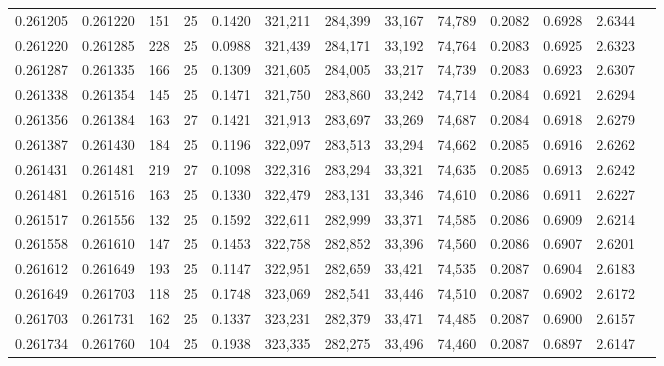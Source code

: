 \begin{tabular}{rrrrrrrrrrrrr}
0.261205 & 0.261220 &   151 &  25 &                                     0.1420 & 321,211 & 284,399 &  33,167 &  74,789 & 0.2082 & 0.6928 & 2.6344 \\
0.261220 & 0.261285 &   228 &  25 &                                     0.0988 & 321,439 & 284,171 &  33,192 &  74,764 & 0.2083 & 0.6925 & 2.6323 \\
0.261287 & 0.261335 &   166 &  25 &                                     0.1309 & 321,605 & 284,005 &  33,217 &  74,739 & 0.2083 & 0.6923 & 2.6307 \\
0.261338 & 0.261354 &   145 &  25 &                                     0.1471 & 321,750 & 283,860 &  33,242 &  74,714 & 0.2084 & 0.6921 & 2.6294 \\
0.261356 & 0.261384 &   163 &  27 &                                     0.1421 & 321,913 & 283,697 &  33,269 &  74,687 & 0.2084 & 0.6918 & 2.6279 \\
0.261387 & 0.261430 &   184 &  25 &                                     0.1196 & 322,097 & 283,513 &  33,294 &  74,662 & 0.2085 & 0.6916 & 2.6262 \\
0.261431 & 0.261481 &   219 &  27 &                                     0.1098 & 322,316 & 283,294 &  33,321 &  74,635 & 0.2085 & 0.6913 & 2.6242 \\
0.261481 & 0.261516 &   163 &  25 &                                     0.1330 & 322,479 & 283,131 &  33,346 &  74,610 & 0.2086 & 0.6911 & 2.6227 \\
0.261517 & 0.261556 &   132 &  25 &                                     0.1592 & 322,611 & 282,999 &  33,371 &  74,585 & 0.2086 & 0.6909 & 2.6214 \\
0.261558 & 0.261610 &   147 &  25 &                                     0.1453 & 322,758 & 282,852 &  33,396 &  74,560 & 0.2086 & 0.6907 & 2.6201 \\
0.261612 & 0.261649 &   193 &  25 &                                     0.1147 & 322,951 & 282,659 &  33,421 &  74,535 & 0.2087 & 0.6904 & 2.6183 \\
0.261649 & 0.261703 &   118 &  25 &                                     0.1748 & 323,069 & 282,541 &  33,446 &  74,510 & 0.2087 & 0.6902 & 2.6172 \\
0.261703 & 0.261731 &   162 &  25 &                                     0.1337 & 323,231 & 282,379 &  33,471 &  74,485 & 0.2087 & 0.6900 & 2.6157 \\
0.261734 & 0.261760 &   104 &  25 &                                     0.1938 & 323,335 & 282,275 &  33,496 &  74,460 & 0.2087 & 0.6897 & 2.6147 \\

\end{tabular}
